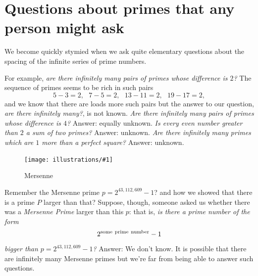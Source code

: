 \documentclass[11pt]{article}
\newcommand{\ill}[3]{ 
   \begin{figure}[H]
   \begin{center}
   \texttt{[image: illustrations/\#1]}
   \caption{#3}
   \end{center}
    \end{figure}
}
\theoremstyle{plain}
\theoremstyle{definition}
\numberwithin{equation}{section}
\numberwithin{figure}{section}
\numberwithin{table}{section}
\begin{document}



\section{Questions about primes that any person might ask}

We become quickly stymied when we ask quite elementary questions about
the spacing of the infinite series of prime numbers.

\bigskip

For example, {\em are there infinitely many pairs of primes whose
  difference is $2$?}  The sequence of primes seems to be rich in such
pairs $$5-3 =2,\ \ \ 7-5=2,\ \ \ 13-11=2,\ \ \ 19-17 =2,$$ and we know
that there are loads more such pairs but the answer to our question,
{\em are there infinitely many?}, is not known. {\em Are there
  infinitely many pairs of primes whose difference is $4$?}  Answer:
equally unknown. {\em Is every even number greater than $2$ a sum of
  two primes?}  Answer: unknown. {\em Are there infinitely many primes
  which are $1$ more than a perfect square?}  Answer: unknown.


\bigskip

\ill{mersenne}{.3}{Mersenne}

Remember the Mersenne prime $p= 2^{43,112,609}-1$? and how we showed
that there is a prime $P$ larger than that? Suppose, though, someone
asked us whether there was a {\it Mersenne Prime} larger than this
$p$: that is, {\em is there a prime number of the form $$2^{\rm some\
  prime\ number}-1$$ bigger than $p= 2^{43,112,609}-1$?} Answer:  We don't
know. It is possible that there are infinitely many Mersenne primes
but we're far from being able to answer such questions.
\end{document}
